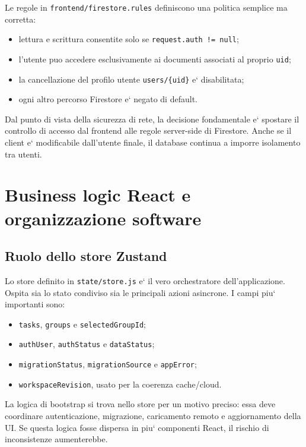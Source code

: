 \documentclass[11pt,a4paper]{article}
\begin{document}
Le regole in \texttt{frontend/firestore.rules} definiscono una politica semplice ma corretta:

\begin{itemize}
  \item lettura e scrittura consentite solo se \texttt{request.auth != null};
  \item l'utente puo accedere esclusivamente ai documenti associati al proprio \texttt{uid};
  \item la cancellazione del profilo utente \texttt{users/\{uid\}} e` disabilitata;
  \item ogni altro percorso Firestore e` negato di default.
\end{itemize}

Dal punto di vista della sicurezza di rete, la decisione fondamentale e` spostare il controllo di accesso dal frontend alle regole server-side di Firestore. Anche se il client e` modificabile dall'utente finale, il database continua a imporre isolamento tra utenti.

\section{Business logic React e organizzazione software}

\subsection{Ruolo dello store Zustand}

Lo store definito in \texttt{state/store.js} e` il vero orchestratore dell'applicazione. Ospita sia lo stato condiviso sia le principali azioni asincrone. I campi piu` importanti sono:

\begin{itemize}
  \item \texttt{tasks}, \texttt{groups} e \texttt{selectedGroupId};
  \item \texttt{authUser}, \texttt{authStatus} e \texttt{dataStatus};
  \item \texttt{migrationStatus}, \texttt{migrationSource} e \texttt{appError};
  \item \texttt{workspaceRevision}, usato per la coerenza cache/cloud.
\end{itemize}

La logica di bootstrap si trova nello store per un motivo preciso: essa deve coordinare autenticazione, migrazione, caricamento remoto e aggiornamento della UI. Se questa logica fosse dispersa in piu` componenti React, il rischio di inconsistenze aumenterebbe.
\end{document}
